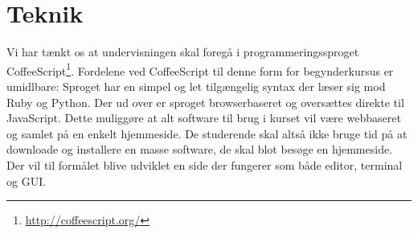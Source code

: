 \documentclass[12pt]{article}
\begin{document}
\section{Teknik}
Vi har tænkt os at undervisningen skal foregå i programmeringssproget 
CoffeeScript\footnote{\url{http://coffeescript.org/}}. Fordelene ved CoffeeScript
til denne form for begynderkursus er umidlbare: Sproget har en simpel og let 
tilgængelig syntax der læser sig mod Ruby og Python. Der ud over er sproget
browserbaseret og oversættes direkte til JavaScript. Dette muliggøre at alt 
software til brug i kurset vil være webbaseret og samlet på en enkelt hjemmeside.
De studerende skal altså ikke bruge tid på at downloade og installere en masse
software, de skal blot besøge en hjemmeside. Der vil til formålet blive udviklet
en side der fungerer som både editor, terminal og GUI.

\end{document}
